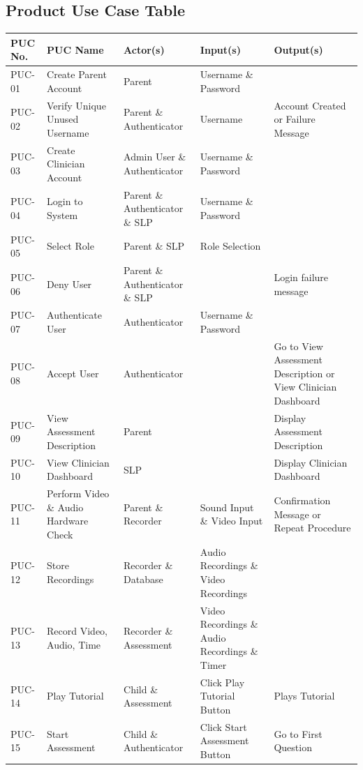 \documentclass[12pt]{article}
\begin{document}
\subsection{Product Use Case Table}
\begin{longtable}{|p{2cm}|p{3.2cm}|p{3.2cm}|p{3cm}|p{3cm}|}
  \toprule {\textbf{PUC No.}} & {\textbf{PUC Name}} & {\textbf{Actor(s)}} & {\textbf{Input(s)}} & {\textbf{Output(s)}} \\
  \midrule
  PUC-01 & Create Parent Account & Parent & Username \& Password & \\
  \hline
  PUC-02 & Verify Unique Unused Username & Parent \& Authenticator & Username & Account Created or Failure Message\\
  \hline
  PUC-03 & Create Clinician Account & Admin User \& Authenticator & Username \& Password & \\
  \hline
  PUC-04 & Login to System & Parent \& Authenticator \& SLP & Username \& Password & \\
  \hline
  PUC-05 & Select Role & Parent \& SLP & Role Selection & \\
  \hline
  PUC-06 & Deny User & Parent \& Authenticator \& SLP & & Login failure message\\
  \hline
  PUC-07 & Authenticate User & Authenticator & Username \& Password & \\
  \hline
  PUC-08 & Accept User & Authenticator & & Go to View Assessment Description or View Clinician Dashboard\\
  \hline
  PUC-09 & View Assessment Description & Parent & & Display Assessment Description\\
  \hline
  PUC-10 & View Clinician Dashboard & SLP & & Display Clinician Dashboard\\
  \hline
  PUC-11 & Perform Video \& Audio Hardware Check & Parent \& Recorder & Sound Input \& Video Input & Confirmation Message or Repeat Procedure\\
  \hline
  PUC-12 & Store Recordings & Recorder \& Database & Audio Recordings \& Video Recordings & \\
  \hline
  PUC-13 & Record Video, Audio, Time & Recorder \& Assessment & Video Recordings \& Audio Recordings \& Timer & \\
  \hline
  PUC-14 & Play Tutorial & Child \& Assessment & Click Play Tutorial Button & Plays Tutorial\\
  \hline
  PUC-15 & Start Assessment & Child \& Authenticator & Click Start Assessment Button & Go to First Question\\

\end{longtable}
\end{document}

